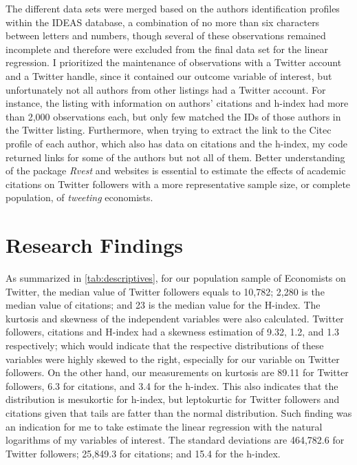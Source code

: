 \documentclass[12pt,english]{article}
\begin{document}
The different data sets were merged based on the authors identification profiles within the IDEAS database, a combination of no more than six characters between letters and numbers, though several of these observations remained incomplete and therefore were excluded from the final data set for the linear regression. I prioritized the maintenance of observations with a Twitter account and a Twitter handle, since it contained our outcome variable of interest, but unfortunately not all authors from other listings had a Twitter account. For instance, the listing with information on authors' citations and h-index had more than 2,000 observations each, but only few matched the IDs of those authors in the Twitter listing. Furthermore, when trying to extract the link to the Citec profile of each author, which also has data on citations and the h-index, my code returned links for some of the authors but not all of them. Better understanding of the package \textit{Rvest} and websites is essential to estimate the effects of academic citations on Twitter followers with a more representative sample size, or complete population, of \textit{tweeting} economists. 


\section{Research Findings}\label{sec:results}
As summarized in \ref{tab:descriptives}, for our population sample of Economists on Twitter, the median value of Twitter followers equals to 10,782; 2,280 is the median value of citations; and 23 is the median value for the H-index. The kurtosis and skewness of the independent variables were also calculated. Twitter followers, citations and H-index had a skewness estimation of 9.32, 1.2, and 1.3 respectively; which would indicate that the respective distributions of these variables were highly skewed to the right, especially for our variable on Twitter followers. On the other hand, our measurements on kurtosis are 89.11 for Twitter followers, 6.3 for citations, and 3.4 for the h-index. This also indicates that the distribution is mesukortic for h-index, but leptokurtic for Twitter followers and citations given that tails are fatter than the normal distribution. Such finding was an indication for me to take estimate the linear regression with the natural logarithms of my variables of interest. The standard deviations are 464,782.6 for Twitter followers; 25,849.3 for citations; and 15.4 for the h-index.
\end{document}
